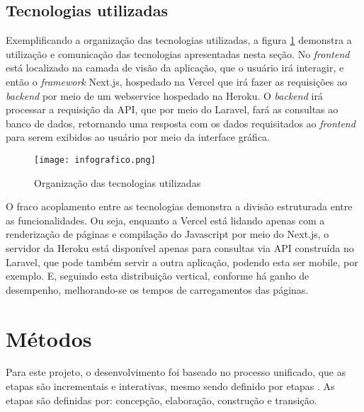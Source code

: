 \subsection{Tecnologias utilizadas}
Exemplificando a organização das tecnologias utilizadas, a figura \ref{info} demonstra a utilização e comunicação das tecnologias apresentadas nesta seção. No \textit{frontend} está localizado na camada de visão da aplicação, que o usuário irá interagir, e então o \textit{framework} Next.js, hospedado na Vercel que irá fazer as requisições ao \textit{backend} por meio de um webservice hospedado na Heroku. O \textit{backend} irá processar a requisição da API, que por meio do Laravel, fará as consultas ao banco de dados, retornando uma resposta com os dados requisitados ao \textit{frontend} para serem exibidos ao usuário por meio da interface gráfica.

\begin{figure}[H]
    \caption{\label{info}Organização das tecnologias utilizadas}
    \vspace{5pt}
    \centering
    \texttt{[image: infografico.png]}
    \vspace{5pt}
\end{figure}

O fraco acoplamento entre as tecnologias demonstra a divisão estruturada entre as funcionalidades. Ou seja, enquanto a Vercel está lidando apenas com a renderização de páginas e compilação do Javascript por meio do Next.js, o servidor da Heroku está disponível apenas para consultas via API construída no Laravel, que pode também servir a outra aplicação, podendo esta ser mobile, por exemplo. E, seguindo esta distribuição vertical, conforme  há ganho de desempenho, melhorando-se os tempos de carregamentos das páginas.


\section{Métodos} \label{metodos}
Para este projeto, o desenvolvimento foi baseado no processo unificado, que as etapas são incrementais e interativas, mesmo sendo definido por etapas \cite{SOMMERVILE}. As etapas são definidas por: concepção, elaboração, construção e transição.


